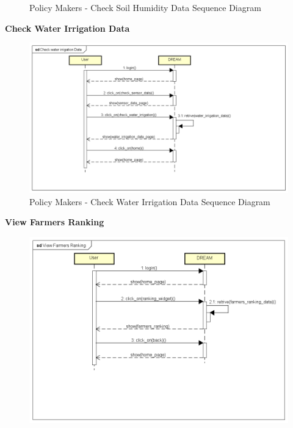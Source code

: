 \documentclass[table, 12pt]{article}
\begin{document}
\begin{itemize}
\begin{center}
\begin{figure}[H]
                    \caption{Policy Makers - Check Soil Humidity Data Sequence Diagram}
                    \label{fig: sequence_soil}
                \end{figure}
            \end{center}
            \newpage
            \textbf{Check Water Irrigation Data}\\
            \begin{center}
                \begin{figure}[H]
                    \includegraphics[scale=0.60, center]{assets/Sequence diagrams/Policy Maker/Check Water Irrigation Data.png}
                    \caption{Policy Makers - Check Water Irrigation Data Sequence Diagram}
                    \label{fig: sequence_irrigation}
                \end{figure}
            \end{center}
            \newpage
            \textbf{View Farmers Ranking}\\
            \begin{center}
                \begin{figure}[H]
                    \includegraphics[scale=0.60, center]{assets/Sequence diagrams/Policy Maker/View Farmers Ranking.png}

\end{figure}
\end{center}
\end{itemize}
\end{document}
